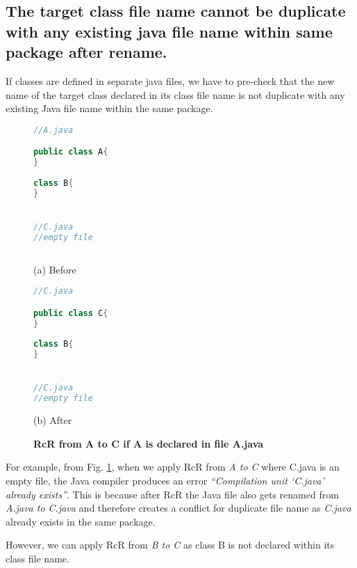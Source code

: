 \subsection{The target class file name cannot be duplicate with any existing java file name within same package after rename.}

If classes are defined in separate java files, we have to pre-check that the new name of the target class declared in its class file name is not duplicate with any existing Java file name within the same package. 

\begin{figure}[th]
\centering
\begin{minipage}[t]{0.45\linewidth}
\begin{lstlisting}[language=java, basicstyle=\scriptsize\ttfamily,frame=single]
//A.java

public class A{
}
	
class B{
}


//C.java
//empty file
 
\end{lstlisting}
\centering(a) Before
\end{minipage}
\hfill
\begin{minipage}[t]{0.45\linewidth}
\begin{lstlisting}[language=java, basicstyle=\scriptsize\ttfamily,frame=single]
//C.java

public class C{
}
	
class B{
}


//C.java
//empty file

\end{lstlisting}
\centering(b) After
\end{minipage}
\caption{\textbf{RcR from A to C if A is declared in file A.java}}
\label{figure:classFileName}
\end{figure}

For example, from Fig. \ref{figure:classFileName}, when we apply RcR from \emph{A to C} where C.java is an empty file, the Java compiler produces an error \textit{``Compilation unit `C.java' already exists''}. This is because after RcR the Java file also gets renamed from \emph{A.java to C.java} and therefore creates a conflict for duplicate file name as \emph{C.java} already exists in the same package. 

However, we can apply RcR from \emph{B to C} as class B is not declared within its class file name. 



